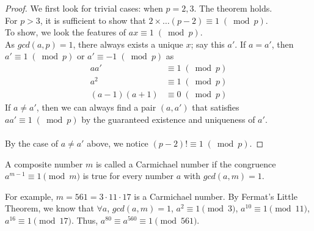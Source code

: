 \begin{proof}
We first look for trivial cases: when $p = 2,3$. The theorem holds. \\
For $p > 3$, it is sufficient to show that $2\times \dots (p - 2)\equiv 1\; (\bmod{p})$. \\
To show, we look the features of $ax\equiv 1\; (\bmod{p})$. \\
As $gcd(a, p) = 1$, there always exists a unique $x$; say this $a'$.
If $a = a'$, then $a'\equiv 1\; (\bmod{p})$ or $a'\equiv -1\; (\bmod{p})$ as 
\begin{align*}
aa' &\equiv 1\; (\bmod{p}) \\
a^{2} &\equiv 1\; (\bmod{p}) \\
(a - 1)(a + 1) &\equiv 0\; (\bmod{p})
\end{align*}
If $a\neq a'$, then we can always find a pair $(a, a')$ that satisfies $aa'\equiv 1\; (\bmod{p})$ by the guaranteed existence and uniqueness of $a'$. \\
\\
By the case of $a\neq a'$ above, we notice $(p - 2)!\equiv 1\; (\bmod{p})$.
\end{proof}

\begin{definition}
A composite number $m$ is called a Carmichael number if the congruence $a^{m - 1}\equiv 1 \pmod{m}$ is true for every number $a$ with $gcd(a, m) = 1$.
\end{definition}

\noindent
For example, $m = 561 = 3\cdot 11\cdot 17$ is a Carmichael number. By Fermat's Little Theorem, we know that $\forall a$, $gcd(a, m) = 1$, $a^{2}\equiv 1 \pmod{3}$, $a^{10}\equiv 1\pmod{11}$, $a^{16}\equiv 1\pmod{17}$. Thus, $a^{80}\equiv a^{560}\equiv 1 \pmod{561}$.